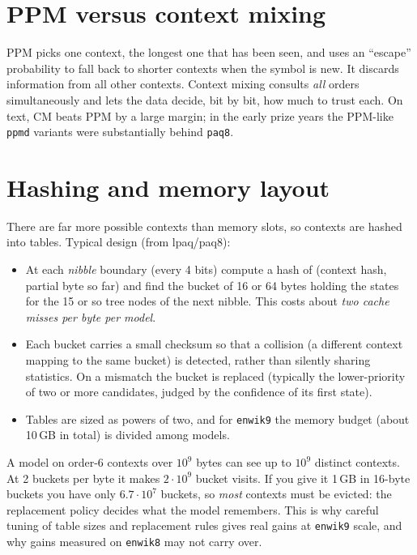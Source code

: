 \documentclass[11pt,a4paper,openany]{book}
\newcommand{\code}[1]{\texttt{#1}}
\theoremstyle{definition}
\theoremstyle{remark}
\begin{document}
\section{PPM versus context mixing}

PPM picks one context, the longest one that has been seen, and uses an ``escape'' probability to fall back to shorter contexts when the symbol is new. It discards information from all other contexts. Context mixing consults \emph{all} orders simultaneously and lets the data decide, bit by bit, how much to trust each. On text, CM beats PPM by a large margin; in the early prize years the PPM-like \code{ppmd} variants were substantially behind \code{paq8}.

\section{Hashing and memory layout}

There are far more possible contexts than memory slots, so contexts are hashed into tables. Typical design (from lpaq/paq8):
\begin{itemize}
\item At each \emph{nibble} boundary (every 4 bits) compute a hash of (context hash, partial byte so far) and find the bucket of 16 or 64 bytes holding the states for the 15 or so tree nodes of the next nibble. This costs about \emph{two cache misses per byte per model}.
\item Each bucket carries a small checksum so that a collision (a different context mapping to the same bucket) is detected, rather than silently sharing statistics. On a mismatch the bucket is replaced (typically the lower-priority of two or more candidates, judged by the confidence of its first state).
\item Tables are sized as powers of two, and for \code{enwik9} the memory budget (about 10\,GB in total) is divided among models.
\end{itemize}

\begin{example}
A model on order-6 contexts over $10^9$ bytes can see up to $10^9$ distinct contexts. At 2 buckets per byte it makes $2\cdot10^9$ bucket visits. If you give it 1\,GB in 16-byte buckets you have only $6.7\cdot10^7$ buckets, so \emph{most} contexts must be evicted: the replacement policy decides what the model remembers. This is why careful tuning of table sizes and replacement rules gives real gains at \code{enwik9} scale, and why gains measured on \code{enwik8} may not carry over.
\end{example}
\end{document}
